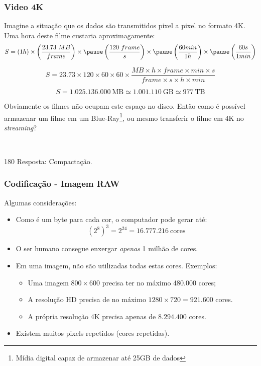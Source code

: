 \documentclass[10pt]{beamer}
\begin{document}
\begin{frame}[t]
    \frametitle{Video 4K}

    Imagine a situação que os dados são transmitidos pixel a pixel no formato 4K. Uma hora deste filme custaria aproximagamente:
    \pause
    $$S = (1h)\times\left(\frac{23.73\ MB}{frame}\right) \times
        \pause\left(\frac{120\ frame}{s}\right)\times
        \pause\left(\frac{60 min}{1h}\right)\times
        \pause\left(\frac{60s}{1min}\right) $$

    \pause
    $$S = 23.73\times 120\times 60\times 60\times\frac{MB\times h\times frame\times min\times s}{frame\times s\times h\times min}$$

    \pause
    $$S = 1.025.136.000\ \text{MB} \simeq 1.001.110\ \text{GB}\simeq 977\ \text{TB}$$

    \pause
    Obviamente os filmes não ocupam este espaço no disco. Então como é possível armazenar um filme em um Blue-Ray\footnote{Mídia digital capaz de armazenar até 25GB de dados}, ou mesmo transferir o filme em 4K no \emph{streaming}?\vfill

    \pause
    \begin{flushbottom}
        \begin{minipage}{\textwidth}
            \ {\raggedleft
            \begin{turn}{180}
                \tiny Resposta: Compactação.
            \end{turn}
            \par}
        \end{minipage}
    \end{flushbottom}
\end{frame}

\begin{frame}[t]
    \frametitle{Codificação - Imagem RAW}
    Algumas considerações:\vfill
    \begin{itemize}
        \setlength\itemsep{2em}
        \item Como é um byte para cada cor, o computador pode gerar até:
              $$(2^8)^3 = 2^{24} = 16.777.216\ \text{cores}$$
        \item O ser humano consegue enxergar \emph{apenas} 1 milhão de cores.
        \item Em uma imagem, não são utilizadas todas estas cores. Exemplos:
              \begin{itemize}
                  \item Uma imagem $800\times 600$ precisa ter no máximo 480.000 cores;
                  \item A resolução HD precisa de no máximo $1280\times 720 = 921.600$ cores.
                  \item A própria resolução 4K precisa apenas de $8.294.400$ cores.
              \end{itemize}
        \item Existem muitos pixels repetidos (cores repetidas).
    \end{itemize}
\end{frame}
\end{document}
